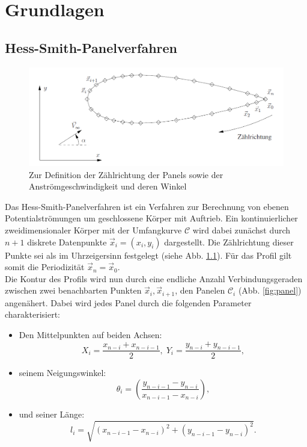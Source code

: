 \chapter{Grundlagen}
\label{chap:hess-smith}


\section{Hess-Smith-Panelverfahren}
\begin{figure}[!h]
\begin{center} \includegraphics[scale=0.3]{figures/zaehlrichtung.png} \end{center}
\caption{Zur Definition der Zählrichtung der Panels sowie der Anströmgeschwindigkeit und deren Winkel}
\label{fig:zaehlrichtung}
\end{figure}
Das Hess-Smith-Panelverfahren ist ein Verfahren zur Berechnung von ebenen Potentialströmungen um geschlossene Körper mit Auftrieb. Ein kontinuierlicher zweidimensionaler Körper mit der Umfangkurve $\mathcal{C}$ wird dabei zunächst durch  $n + 1$ diskrete Datenpunkte $\vec x_i = (x_i, y_i)$ dargestellt. Die Zählrichtung dieser Punkte sei als im Uhrzeigersinn festgelegt (siehe Abb. \ref{fig:zaehlrichtung}). Für das Profil gilt somit die Periodizität $\vec x_n = \vec x_0$.\\
Die Kontur des Profils wird nun durch eine endliche Anzahl Verbindungsgeraden zwischen zwei benachbarten Punkten $\vec x_i, \vec x_{i+1}$, den Panelen $\mathcal{C}_i$ (Abb. \ref{fig:panel}) angenähert. Dabei wird jedes Panel durch die folgenden Parameter charakterisiert:
\begin{itemize}
\item Den Mittelpunkten auf beiden Achsen: 
\begin{equation}
X_i =  \frac{x_{n-i}+x_{n-i-1}}{2}, \; Y_i =  \frac{y_{n-i}+y_{n-i-1}}{2},
\end{equation}
\item seinem Neigungswinkel: 
\begin{equation}
\theta_i =  \left( \frac{y_{n-i-1} - y_{n-i}}{x_{n-i-1} - x_{n-i}} \right),
\end{equation}
\item und seiner Länge: 
\begin{equation}
l_i =  \sqrt{(x_{n-i-1} - x_{n-i})^2 + (y_{n-i-1} - y_{n-i})^2}.
\end{equation}
\end{itemize}



